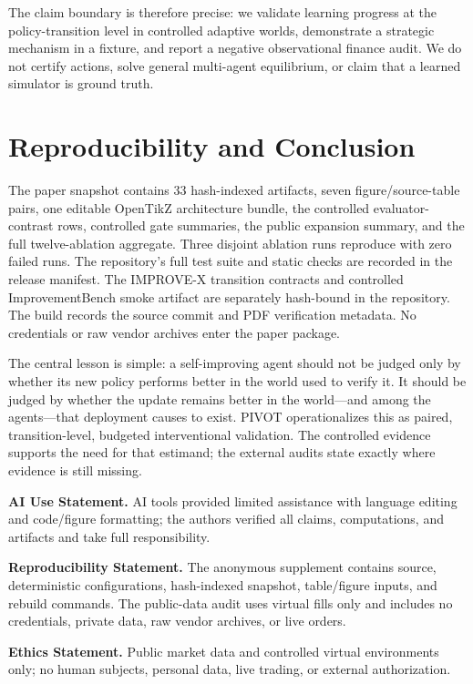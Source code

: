 \documentclass{article} %
\begin{document}
The claim boundary is therefore precise: we validate learning progress at the
policy-transition level in controlled adaptive worlds, demonstrate a
strategic mechanism in a fixture, and report a negative observational finance
audit. We do not certify actions, solve general multi-agent equilibrium, or
claim that a learned simulator is ground truth.

\section{Reproducibility and Conclusion}
The paper snapshot contains 33 hash-indexed artifacts, seven figure/source-table
pairs, one editable OpenTikZ architecture bundle, the controlled evaluator-contrast rows, controlled gate summaries, the
public expansion summary, and the full twelve-ablation aggregate. Three
disjoint ablation runs reproduce with zero failed runs. The repository's full
test suite and static checks are recorded in the release manifest. The IMPROVE-X transition contracts and controlled
ImprovementBench smoke artifact are separately hash-bound in the repository.
The build records the source commit and PDF verification metadata. No
credentials or raw vendor archives enter the paper package.

The central lesson is simple: a self-improving agent should not be judged only
by whether its new policy performs better in the world used to verify it. It
should be judged by whether the update remains better in the world---and among
the agents---that deployment causes to exist. PIVOT operationalizes this as
paired, transition-level, budgeted interventional validation. The controlled
evidence supports the need for that estimand; the external audits state exactly
where evidence is still missing.

\begingroup\scriptsize
\noindent\textbf{AI Use Statement.} AI tools provided limited assistance with
language editing and code/figure formatting; the authors verified all claims,
computations, and artifacts and take full responsibility.
\par\noindent\textbf{Reproducibility Statement.} The anonymous supplement
contains source, deterministic configurations, hash-indexed snapshot,
table/figure inputs, and rebuild commands. The public-data audit uses virtual
fills only and includes no credentials, private data, raw vendor archives, or
live orders.
\par\noindent\textbf{Ethics Statement.} Public market data and controlled
virtual environments only; no human subjects, personal data, live trading, or
external authorization.
\endgroup
\end{document}
